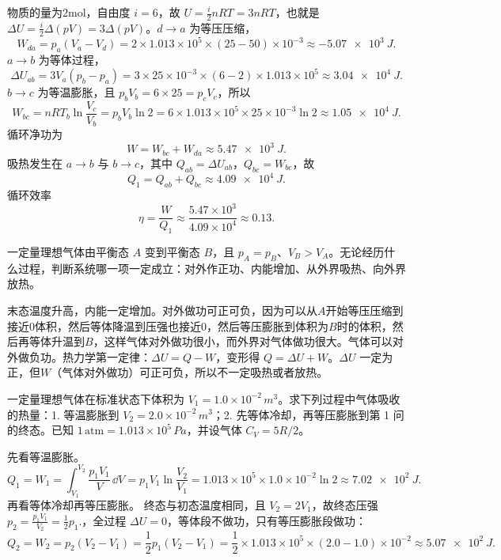 \begin{solution}
物质的量为$2$mol，自由度 \(i=6\)，故 \(U=\frac{i}{2}nRT=3nRT\)，也就是 \(\Delta U=\frac{i}{2}\Delta(pV)=3\Delta(pV)\)。\(d\to a\) 为等压压缩，
\[
W_{da}=p_a(V_a-V_d)
=2\times1.013\times10^5\times(25-50)\times10^{-3}
\approx -\SI{5.07e3}{J}.
\]
\(a\to b\) 为等体过程，
\[
\Delta U_{ab}=3V_a(p_b-p_a)
=3\times25\times10^{-3}\times(6-2)\times1.013\times10^5
\approx \SI{3.04e4}{J}.
\]
\(b\to c\) 为等温膨胀，且 \(p_bV_b=6\times25=p_cV_c\)，所以
 \[W_{bc}=nRT_b\ln\frac{V_c}{V_b} =p_bV_b\ln2 =6\times1.013\times10^5\times25\times10^{-3}\ln2 \approx \SI{1.05e4}{J}.\]
循环净功为
 \[W=W_{bc}+W_{da}\approx \SI{5.47e3}{J}.\]
吸热发生在 \(a\to b\) 与 \(b\to c\)，其中 \(Q_{ab}=\Delta U_{ab}\)，\(Q_{bc}=W_{bc}\)，故
 \[Q_1=Q_{ab}+Q_{bc} \approx \SI{4.09e4}{J}.\]
循环效率
 \[\eta=\frac{W}{Q_1} \approx \frac{5.47\times10^3}{4.09\times10^4} \approx 0.13.\]
\end{solution}

\begin{exercise}
一定量理想气体由平衡态 \(A\) 变到平衡态 \(B\)，且 \(p_A=p_B\)、\(V_B>V_A\)。无论经历什么过程，判断系统哪一项一定成立：对外作正功、内能增加、从外界吸热、向外界放热。
\end{exercise}

\begin{solution}
末态温度升高，内能一定增加。对外做功可正可负，因为可以从$A$开始等压压缩到接近0体积，然后等体降温到压强也接近0，然后等压膨胀到体积为$B$时的体积，然后再等体升温到$B$，这样气体对外做功很小，而外界对气体做功很大。气体可以对外做负功。热力学第一定律：\(\Delta U = Q - W\)，变形得 \(Q=\Delta U + W\)。\(\Delta U\) 一定为正，但$W$（气体对外做功）可正可负，所以不一定吸热或者放热。
\end{solution}

\begin{exercise}[标准状态理想气体两条路径到同一终态的吸热]
一定量理想气体在标准状态下体积为 \(V_1=1.0\times10^{-2}\,\si{m^3}\)。求下列过程中气体吸收的热量：1. 等温膨胀到 \(V_2=2.0\times10^{-2}\,\si{m^3}\)；2. 先等体冷却，再等压膨胀到第 1 问的终态。已知 \(1\,\mathrm{atm}=1.013\times10^5\,\si{Pa}\)，并设气体 \(C_V=5R/2\)。
\end{exercise}

\begin{solution}
先看等温膨胀。
 \[Q_1=W_1=\int_{V_1}^{V_2}\frac{p_1V_1}{V}\,\dd V =p_1V_1\ln\frac{V_2}{V_1}=1.013\times10^5\times1.0\times10^{-2}\ln2 \approx \SI{7.02e2}{J}.\]
再看等体冷却再等压膨胀。 终态与初态温度相同，且 \(V_2=2V_1\)，故终态压强\(p_2=\frac{p_1V_1}{V_2}=\frac12p_1.\)，全过程 \(\Delta U=0\)，等体段不做功，只有等压膨胀段做功：
 \[Q_2=W_2=p_2(V_2-V_1) =\frac12p_1(V_2-V_1)=\frac12\times1.013\times10^5\times(2.0-1.0)\times10^{-2}
\approx \SI{5.07e2}{J}.\]
\end{solution}

